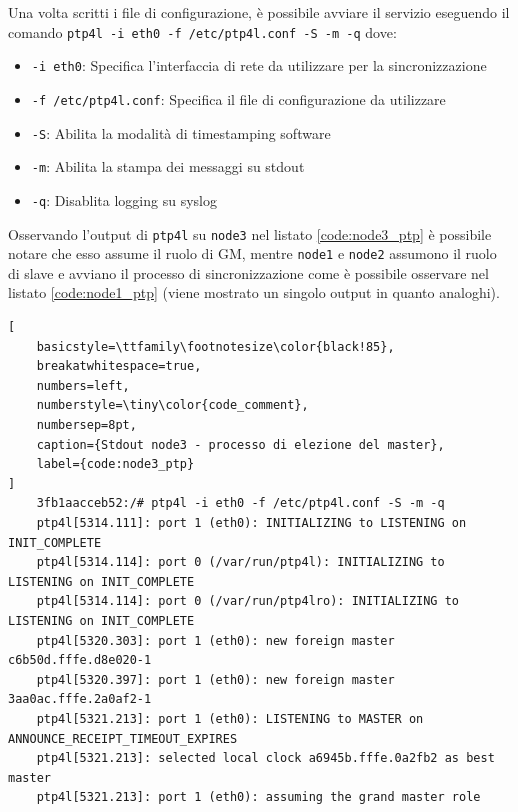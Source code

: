 \documentclass[12pt,a4paper,twoside]{book}
\begin{document}
\begin{onehalfspace}
Una volta scritti i file di configurazione, è possibile avviare il servizio eseguendo il comando \texttt{ptp4l -i eth0 -f /etc/ptp4l.conf -S -m -q} dove:
\begin{itemize}
    \item \texttt{-i eth0}: Specifica l'interfaccia di rete da utilizzare per la sincronizzazione
    \item \texttt{-f /etc/ptp4l.conf}: Specifica il file di configurazione da utilizzare
    \item \texttt{-S}: Abilita la modalità di timestamping software
    \item \texttt{-m}: Abilita la stampa dei messaggi su stdout
    \item \texttt{-q}: Disablita logging su syslog
\end{itemize}

Osservando l'output di \texttt{ptp4l} su \texttt{node3} nel listato \ref{code:node3_ptp} è possibile notare che esso assume il ruolo di GM, mentre \texttt{node1} e \texttt{node2} assumono il ruolo di slave e avviano il processo di sincronizzazione come è possibile osservare nel listato \ref{code:node1_ptp} (viene mostrato un singolo output in quanto analoghi).

\begin{lstlisting}[
    basicstyle=\ttfamily\footnotesize\color{black!85},
    breakatwhitespace=true,
    numbers=left,
    numberstyle=\tiny\color{code_comment},
    numbersep=8pt,
    caption={Stdout node3 - processo di elezione del master},
    label={code:node3_ptp}
]
    3fb1aacceb52:/# ptp4l -i eth0 -f /etc/ptp4l.conf -S -m -q
    ptp4l[5314.111]: port 1 (eth0): INITIALIZING to LISTENING on INIT_COMPLETE
    ptp4l[5314.114]: port 0 (/var/run/ptp4l): INITIALIZING to LISTENING on INIT_COMPLETE
    ptp4l[5314.114]: port 0 (/var/run/ptp4lro): INITIALIZING to LISTENING on INIT_COMPLETE
    ptp4l[5320.303]: port 1 (eth0): new foreign master c6b50d.fffe.d8e020-1
    ptp4l[5320.397]: port 1 (eth0): new foreign master 3aa0ac.fffe.2a0af2-1
    ptp4l[5321.213]: port 1 (eth0): LISTENING to MASTER on ANNOUNCE_RECEIPT_TIMEOUT_EXPIRES
    ptp4l[5321.213]: selected local clock a6945b.fffe.0a2fb2 as best master
    ptp4l[5321.213]: port 1 (eth0): assuming the grand master role
\end{lstlisting}

\vspace{2.5cm}


\end{onehalfspace}
\end{document}
